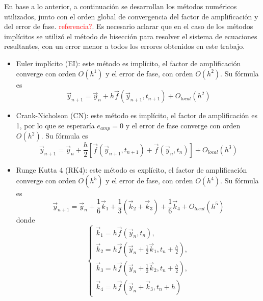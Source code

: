 \documentclass[aps,prb,twocolumn,superscriptaddress,floatfix,longbibliography]{revtex4-2}
\newcounter{para}
\begin{document}
En base a lo anterior, a continuación se desarrollan los métodos numéricos utilizados, junto con el orden global de convergencia del factor de amplificación  y del error de fase. \textcolor{red}{referencia?}. Es necesario aclarar que en el caso de los métodos implícitos se utilizó el método de bisección para resolver el sistema de ecuaciones resultantes, con un error menor a todos los errores obtenidos en este trabajo.
\begin{itemize}
  \item Euler implícito (EI): este método es implícito, el factor de amplificación converge con orden $O(h^1)$ y el error de fase, con orden $O(h^2)$. Su fórmula es
  \begin{equation}
    \vec{y}_{n+1} = \vec{y}_n + h \vec{f}(\vec{y}_{n+1}, t_{n+1}) + O_{local}(h^2)
    \label{eq:Euler_implicito}
  \end{equation}

  \item Crank-Nicholson (CN): este método es implícito, el factor de amplificación es 1, por lo que se esperaría $e_{amp} = 0$ y el error de fase converge con orden $O(h^2)$. Su fórmula es
  \begin{equation}
    \vec{y}_{n+1} = \vec{y}_n + \frac{h}{2} [ \vec{f}(\vec{y}_{n+1}, t_{n+1}) + \vec{f}(\vec{y}_{n}, t_{n}) ]+ O_{local}(h^3)
    \label{eq:Crank_Nicholson}
  \end{equation}

  \item Runge Kutta 4 (RK4): este método es explícito, el factor de amplificación converge con orden $O(h^5)$ y el error de fase, con orden $O(h^4)$. Su fórmula es
  \begin{equation}
    \vec{y}_{n+1} = \vec{y}_n + \frac{1}{6} \vec{k}_1 + \frac{1}{3} (\vec{k}_2 + \vec{k}_3) + \frac{1}{6} \vec{k}_4 + O_{local}(h^5)
    \label{eq:Runge_Kutta_4}
  \end{equation}
  donde
  \[
    \left\{\begin{matrix}
      \vec{k}_1 = h \vec{f}(\vec{y}_n, t_n), \\ 
      \vec{k}_2 = h \vec{f} \left( \vec{y}_n + \frac{1}{2} \vec{k}_1 , t_n + \frac{h}{2}\right), \\
      \vec{k}_3 = h \vec{f} \left ( \vec{y}_n + \frac{1}{2} \vec{k}_2 , t_n + \frac{h}{2}  \right ), \\
      \vec{k}_4 = h \vec{f}(\vec{y}_n + \vec{k}_3, t_n + h)
    \end{matrix}\right.
  \]


\end{itemize}
\end{document}

